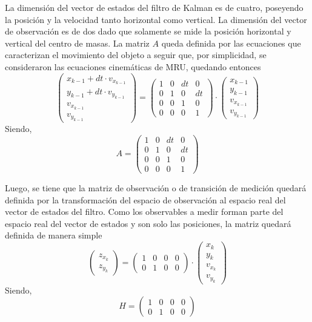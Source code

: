 La dimensión del vector de estados del filtro de Kalman es de cuatro, poseyendo la posición y la velocidad tanto horizontal como vertical. La dimensión del vector de observación es de dos dado que solamente se mide la posición horizontal y vertical del centro de masas. La matriz $A$ queda definida por las ecuaciones que caracterizan el movimiento del objeto a seguir que, por simplicidad, se consideraron las ecuaciones cinemáticas de MRU, quedando entonces
\begin{equation}
\begin{pmatrix} x_{k-1} + dt\cdot v_{x_{k-1}} \\y_{k-1} + dt\cdot v_{y_{k-1}} \\ v_{x_{k-1}}  \\ v_{y_{k-1}} \end{pmatrix} =\begin{pmatrix}
1 & 0 & dt  & 0\\
0 & 1  & 0 & dt\\
0 & 0  & 1  & 0\\
0 & 0  & 0  & 1 
\end{pmatrix} \cdot \begin{pmatrix} x_{k-1}\\y_{k-1} \\ v_{x_{k-1}}  \\ v_{y_{k-1}} \end{pmatrix}
\end{equation}
Siendo, 
\begin{equation}
A = 
\begin{pmatrix}
1 & 0 & dt  & 0\\
0 & 1  & 0 & dt\\
0 & 0  & 1  & 0\\
0 & 0  & 0  & 1 
\end{pmatrix}
\end{equation}

Luego, se tiene que la matriz de observación o de transición de medición quedará definida por la transformación del espacio de observación al espacio real del vector de estados del filtro. Como los observables a medir forman parte del espacio real del vector de estados y son solo las posiciones, la matriz quedará definida de manera simple
\begin{equation}
\begin{pmatrix} z_{x_{k}} \\ z_{y_{k}} \end{pmatrix}=\begin{pmatrix}
1 & 0 & 0  & 0\\
0 & 1  & 0 & 0  \end{pmatrix} \cdot  \begin{pmatrix} x_k \\ y_k \\ v_{x_{k}} \\ v_{y_{k}}
\end{pmatrix}
\end{equation}
Siendo,
\begin{equation}
H = 
\begin{pmatrix}
1 & 0 & 0  & 0\\
0 & 1  & 0 & 0 
\end{pmatrix}
\end{equation}

